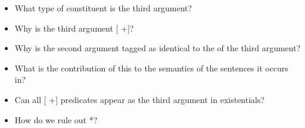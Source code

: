 \documentclass[a4paper,landscape,headrule,footrule]{foils}
\begin{document}



\begin{itemize}
\item What type of constituent is the third argument?
\item Why is the third argument [ +]?
\item Why is the second argument tagged as identical to the 
  of the third argument?
\end{itemize}

\begin{center}
  \begin{tiny}
  \end{tiny}
\end{center}


\begin{itemize}
\item What is the contribution of this  to the semantics of the sentences 
it occurs in?
\item Can all [ +] predicates appear as the third argument in 
existentials?
\item How do we rule out *?  
\end{itemize}
\end{document}
